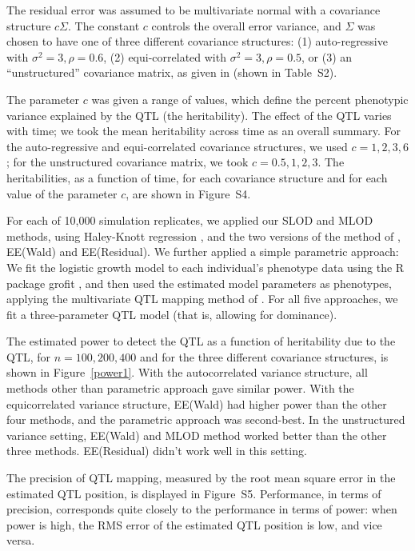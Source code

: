 \documentclass[12pt,letterpaper]{article}
\begin{document}
The residual error was assumed to be multivariate normal with a
covariance structure $c\Sigma$. The constant $c$ controls the overall
error variance, and $\Sigma$ was chosen to have one of three different
covariance structures: (1) auto-regressive with $\sigma^2 =3, \rho =
0.6$, (2) equi-correlated with $\sigma^2 =3, \rho = 0.5$, or (3) an
``unstructured'' covariance matrix, as given in \citet{Yap2009} (shown
in Table~S2).

The parameter $c$ was given a range of values, which define the
percent phenotypic variance explained by the QTL (the heritability).
The effect of the QTL varies with time; we took the mean heritability
across time as an overall summary.  For the auto-regressive and
equi-correlated covariance structures, we used $c = 1,2,3,6$; for the
unstructured covariance matrix, we took $c = 0.5, 1, 2, 3$.
The
heritabilities, as a function of time, for each covariance structure
and for each value of the parameter $c$, are shown in
Figure~S4.

For each of 10,000 simulation replicates, we applied our SLOD and MLOD
methods, using Haley-Knott regression \citep{Haley1992}, and the two
versions of the method of \citet{Xiong2011}, EE(Wald) and
EE(Residual). We further applied a simple parametric approach: We fit
the logistic growth model to each individual's phenotype data using
the R package grofit \citep{Kahm2010}, and then used the estimated
model parameters as phenotypes, applying the multivariate QTL mapping
method of \citet{Knott2000}. For all five approaches, we fit a
three-parameter QTL model (that is, allowing for dominance).

The estimated power to detect the QTL as a function of heritability
due to the QTL, for $n=100, 200, 400$ and for the three different covariance
structures, is shown in Figure~\ref{power1}.
With the autocorrelated variance structure, all methods other than
parametric approach gave similar power. With the equicorrelated
variance structure, EE(Wald) had higher power than the other four
methods, and the parametric approach was second-best.
In the unstructured variance setting, EE(Wald) and MLOD method worked better
than the other three methods. EE(Residual) didn't work well in
this setting.

The precision of QTL mapping, measured by the root mean square
error in the estimated QTL position, is displayed in Figure~S5.
Performance, in terms of precision, corresponds quite closely to the
performance in terms of power: when power is high, the RMS error of
the estimated QTL position is low, and vice versa.
\end{document}
